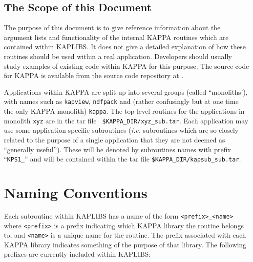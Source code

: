 \documentclass[11pt]{starlink}
\begin{document}
\subsection{The Scope of this Document}
The purpose of this document is to give reference information about the
argument lists and functionality of the internal KAPPA routines which are
contained within KAPLIBS. It does not give a detailed explanation of how
these routines should be used within a real application. Developers
should usually study examples of existing code within KAPPA for this
purpose. The source code for KAPPA is available from the source code
repository at .

Applications within KAPPA are split up into several groups (called
``monoliths'), with names such as \texttt{kapview}, \texttt{ndfpack} and
(rather confusingly but at one time the only KAPPA monolith)
\texttt{kappa}. The top-level routines for the
applications in monolith \texttt{xyz} are in the tar file \texttt{
\$KAPPA\_DIR/xyz\_sub.tar}. Each application may use some
application-specific subroutines (\emph{i.e.} subroutines which are so
closely related to the purpose of a single application that they are not
deemed as ``generally useful''). These will be denoted by subroutines
names with prefix ``\texttt{KPS1\_}'' and will be contained within the tar
file \texttt{\$KAPPA\_DIR/kapsub\_sub.tar}.

\section{Naming Conventions}
Each subroutine within KAPLIBS has a name of the form \texttt{<prefix>\_<name>}
where \texttt{<prefix>} is a prefix indicating which KAPPA library the
routine belongs to, and \texttt{<name>} is a unique name for the routine.
The prefix associated with each KAPPA library indicates something of the
purpose of that library. The following prefixes are currently included
within KAPLIBS:
\end{document}
